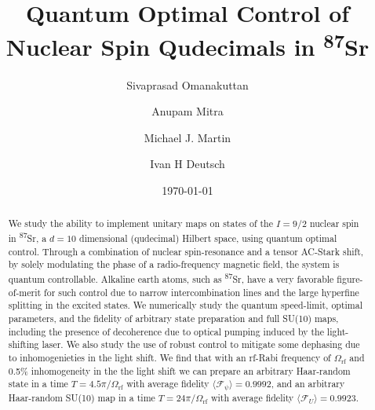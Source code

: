 \documentclass[aps,prl,twocolumn,reprint,superscriptaddress,footinbib]{revtex4-2}
\begin{document}
\widetext


\title{Quantum Optimal Control of Nuclear Spin Qudecimals in \textsuperscript{87}Sr}

\author{Sivaprasad Omanakuttan}
\author{Anupam Mitra}
\author{Michael J. Martin }
\author{Ivan H Deutsch}



\date{\today}
\begin{abstract}
We study the ability to implement unitary maps on states of the $I=9/2$ nuclear spin in \textsuperscript{87}Sr, a $d=10$  dimensional (qudecimal) Hilbert space, using quantum optimal control. Through a combination of nuclear spin-resonance and a tensor AC-Stark shift, by solely modulating the phase of a radio-frequency magnetic field, the system is quantum controllable.  Alkaline earth atoms, such as \textsuperscript{87}Sr, have a very favorable figure-of-merit for such control due to  narrow  intercombination lines and the large hyperfine splitting in the excited states. We numerically study the quantum speed-limit, optimal parameters, and the fidelity of arbitrary state preparation and full SU(10) maps, including the presence of decoherence due to optical pumping induced by the light-shifting laser. We also study the use of robust control to mitigate some dephasing due to inhomogenieties  in the light shift.  We find that with an  rf-Rabi frequency of $\Omega_\text{rf}$ and 0.5\% inhomogeneity  in the the light shift we can prepare an arbitrary Haar-random state in a time  $T={4.5}\pi/\Omega_\text{rf}$  with average fidelity $\langle \mathcal{F}_\psi \rangle =0.9992$, and an arbitrary Haar-random SU(10) map in a time $T=24\pi/\Omega_\text{rf}$ with average fidelity $\langle \mathcal{F}_U \rangle = 0.9923$.

 \end{abstract}
\maketitle
\end{document}
